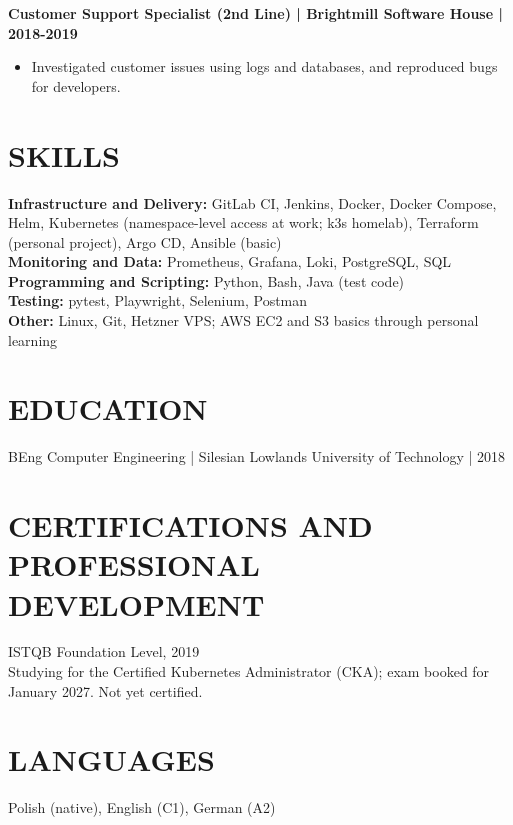 \documentclass[11pt,a4paper]{article}
\begin{document}
\textbf{Customer Support Specialist (2nd Line) | Brightmill Software House | 2018-2019}
\begin{itemize}
\item Investigated customer issues using logs and databases, and reproduced bugs for developers.
\end{itemize}

\section*{SKILLS}
\textbf{Infrastructure and Delivery:} GitLab CI, Jenkins, Docker, Docker Compose, Helm, Kubernetes (namespace-level access at work; k3s homelab), Terraform (personal project), Argo CD, Ansible (basic)\\
\textbf{Monitoring and Data:} Prometheus, Grafana, Loki, PostgreSQL, SQL\\
\textbf{Programming and Scripting:} Python, Bash, Java (test code)\\
\textbf{Testing:} pytest, Playwright, Selenium, Postman\\
\textbf{Other:} Linux, Git, Hetzner VPS; AWS EC2 and S3 basics through personal learning

\section*{EDUCATION}
BEng Computer Engineering | Silesian Lowlands University of Technology | 2018

\section*{CERTIFICATIONS AND PROFESSIONAL DEVELOPMENT}
ISTQB Foundation Level, 2019\\
Studying for the Certified Kubernetes Administrator (CKA); exam booked for January 2027. Not yet certified.

\section*{LANGUAGES}
Polish (native), English (C1), German (A2)
\end{document}
